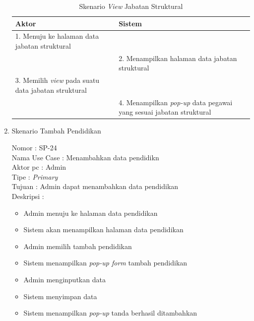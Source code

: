 \begin{enumerate}
\begin{itemize}
\end{itemize}

\begin{table}
	\caption{Skenario \textit{View} Jabatan Struktural}
	\centering
	\begin{tabular}{ | p{75.5mm} | p{53mm}|}
		\hline 
		\textbf{Aktor} & \textbf{Sistem} \\
		\hline
		
		1.	Menuju ke halaman data jabatan struktural &  \\
		
		\hline
		
		&  2.	Menampilkan halaman data jabatan struktural\\
		
		\hline
		
		3. Memilih \textit{view} pada suatu data jabatan struktural& \\
		
		\hline
		
		& 4.	Menampilkan \textit{pop-up} data pegawai yang sesuai jabatan struktural \\
		\hline
		
	\end{tabular}
\end{table}

\item Skenario Tambah Pendidikan

Nomor \kern 3.6pc : SP-24 \\
Nama Use Case : Menambahkan data pendidikn \\
Aktor  pc : Admin \\
Tipe \kern 4.6pc : \textit{Primary} \\
Tujuan \kern 3.6pc : Admin dapat menambahkan data pendidikan \\
Deskripsi \kern 2.5pc : 

\begin{itemize}
	\item Admin menuju ke halaman data pendidikan
	\item Sistem akan menampilkan halaman data pendidikan
	\item Admin memilih tambah pendidikan
	\item Sistem menampilkan \textit{pop-up form} tambah pendidikan
	\item Admin menginputkan data
	\item Sistem menyimpan data
	\item Sistem menampilkan \textit{pop-up} tanda berhasil ditambahkan
	

\end{itemize}
\end{enumerate}
